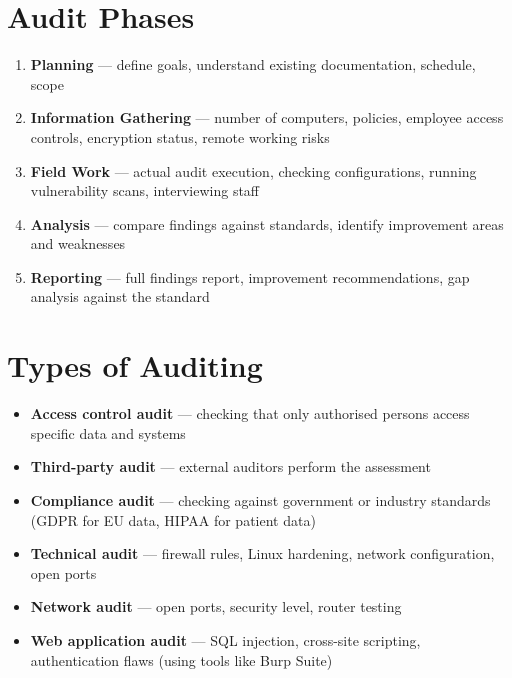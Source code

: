 \section{Audit Phases}
\label{sec:audit_phases}

\begin{enumerate}
  \item \textbf{Planning} --- define goals, understand existing documentation,
        schedule, scope
  \item \textbf{Information Gathering} --- number of computers, policies,
        employee access controls, encryption status, remote working risks
  \item \textbf{Field Work} --- actual audit execution, checking configurations,
        running vulnerability scans, interviewing staff
  \item \textbf{Analysis} --- compare findings against standards, identify
        improvement areas and weaknesses
  \item \textbf{Reporting} --- full findings report, improvement recommendations,
        gap analysis against the standard
\end{enumerate}

\section{Types of Auditing}
\label{sec:audit_types}

\begin{itemize}
  \item \textbf{Access control audit} --- checking that only authorised persons
        access specific data and systems
  \item \textbf{Third-party audit} --- external auditors perform the assessment
  \item \textbf{Compliance audit} --- checking against government or industry
        standards (GDPR for EU data, HIPAA for patient data)
  \item \textbf{Technical audit} --- firewall rules, Linux hardening, network
        configuration, open ports
  \item \textbf{Network audit} --- open ports, security level, router testing
  \item \textbf{Web application audit} --- SQL injection, cross-site scripting,
        authentication flaws (using tools like Burp Suite)
\end{itemize}

